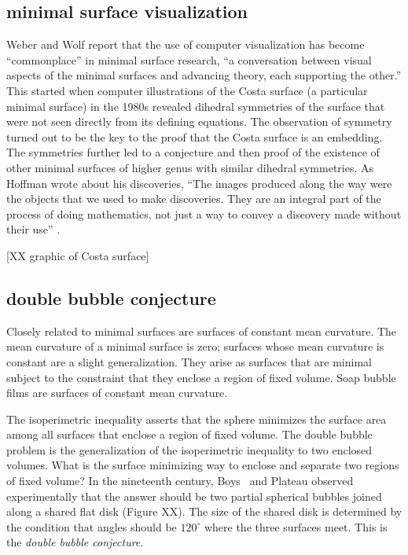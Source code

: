 \documentclass{llncs}
\begin{document}
\subsection{minimal surface visualization} %

Weber and Wolf \cite{WW11} report that the use of computer
visualization has become ``commonplace'' in minimal surface research,
``a conversation between visual aspects of the minimal surfaces and
advancing theory, each supporting the other.''  This started when
computer illustrations of the Costa surface (a particular minimal
surface) in the 1980s revealed dihedral symmetries of the surface that
were not seen directly from its defining equations.  The observation
of symmetry turned out to be the key to the proof that the Costa
surface is an embedding.  The symmetries further led to a conjecture
and then proof of the existence of other minimal surfaces of higher
genus with similar dihedral symmetries.  As Hoffman wrote about his discoveries, ``The
images produced along the way were the objects that we used to make
discoveries. They are an integral part of the process of doing
mathematics, not just a way to convey a discovery made without their
use'' \cite{Hoffman}.

[XX graphic of Costa surface]


\subsection{double bubble conjecture}

Closely related to minimal surfaces are surfaces of constant mean
curvature.  The mean curvature of a minimal surface is zero; surfaces
whose mean curvature is constant are a slight generalization.  They
arise as surfaces that are minimal subject to the constraint that
they enclose a region of fixed volume.  Soap bubble films are
surfaces of constant mean curvature.  

The isoperimetric inequality asserts that the sphere minimizes the
surface area among all surfaces that enclose a region of fixed volume.
The double bubble problem is the generalization of the isoperimetric
inequality to two enclosed volumes.  What is the surface minimizing way
to enclose and separate two regions of fixed volume?  In the
nineteenth century, Boys~\cite{Boy1890} and Plateau observed
experimentally that the answer should be two partial spherical bubbles
joined along a shared flat disk (Figure XX).  The size of the shared
disk is determined by the condition that angles should be $120^\circ$
where the three surfaces meet.  This is the {\it double bubble
  conjecture}.
\end{document}
